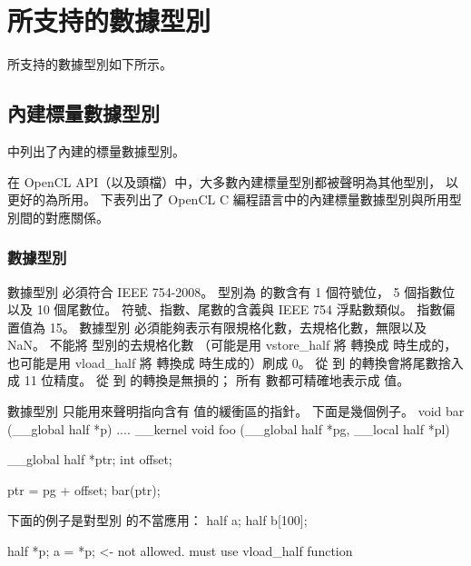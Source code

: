 \section{所支持的數據型別}

所支持的數據型別如下所示。

\subsection[sec:bisdt]{內建標量數據型別}

中列出了內建的標量數據型別。

{}

在 OpenCL API（以及頭檔）中，大多數內建標量型別都被聲明為其他型別，
以更好的為所用。
下表列出了 OpenCL C 編程語言中的內建標量數據型別與所用型別間的對應關係。



\subsubsection[sec:dataTypeHalf]{數據型別 }

數據型別  必須符合 IEEE 754-2008。
型別為  的數含有 1 個符號位， 5 個指數位以及 10 個尾數位。
符號、指數、尾數的含義與 IEEE 754 浮點數類似。
指數偏置值為 15。
數據型別  必須能夠表示有限規格化數，去規格化數，無限以及 NaN。
不能將  型別的去規格化數
（可能是用 vstore_half 將  轉換成  時生成的，
也可能是用 vload_half 將  轉換成  時生成的）刷成 0。
從  到  的轉換會將尾數捨入成 11 位精度。
從   到  的轉換是無損的；
所有  數都可精確地表示成  值。

數據型別  只能用來聲明指向含有  值的緩衝區的指針。
下面是幾個例子。
\startclc
void bar (__global half *p)
{
	....
}
__kernel void foo (__global half *pg, __local half *pl)
{
	__global half *ptr;
	int offset;

	ptr = pg + offset;
	bar(ptr);
}
\stopclc

下面的例子是對型別  的不當應用：
\startclc
half a;
half b[100];

half *p;
a = *p;		<- not allowed. must use vload_half function
\stopclc

